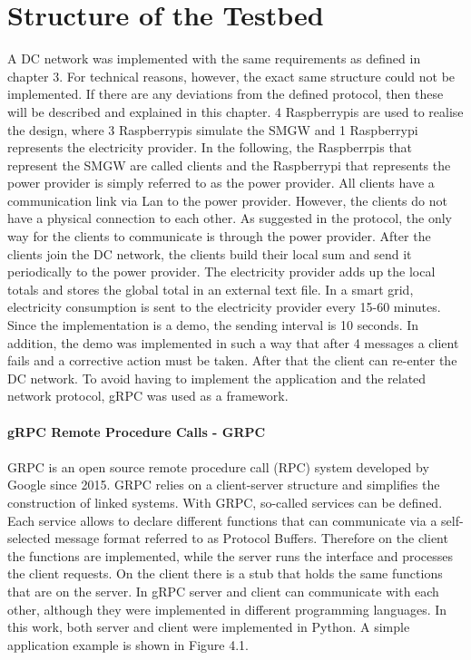 \section{Structure of the Testbed}
A DC network was implemented with the same requirements as defined in chapter 3. For technical reasons, however, the exact same structure could not be implemented. If there are any deviations from the defined protocol, then these will be described and explained in this chapter.
4 Raspberrypis are used to realise the design, where 3 Raspberrypis simulate the SMGW and 1 Raspberrypi represents the electricity provider.  In the following, the Raspberrpis that represent the SMGW are called clients and the Raspberrypi that represents the power provider is simply referred to as the power provider. All clients have a communication link via Lan to the power provider. However, the clients do not have a physical connection to each other. As suggested in the protocol, the only way for the clients to communicate is through the power provider. After the clients join the DC network, the clients build their local sum and send it periodically to the power provider. The electricity provider adds up the local totals and stores the global total in an external text file. In a smart grid, electricity consumption is sent to the electricity provider every 15-60 minutes. Since the implementation is a demo, the sending interval is 10 seconds. In addition, the demo was implemented in such a way that after 4 messages a client fails and a corrective action must be taken. After that the client can re-enter the DC network. To avoid having to implement the application and the related network protocol, gRPC was used as a framework.\\
\\
\textbf{gRPC Remote Procedure Calls - GRPC}
\\
\\
GRPC is an open source remote procedure call (RPC) system developed by Google since 2015. GRPC relies on a client-server structure and simplifies the construction of linked systems. With GRPC, so-called services can be defined. Each service allows to declare different functions that can communicate via a self-selected message format referred to as Protocol Buffers. Therefore on the client the functions are implemented, while the server runs the interface and processes the client requests. On the client there is a stub that holds the same functions that are on the server. In gRPC server and client can communicate with each other, although they were implemented in different programming languages. In this work, both server and client were implemented in Python. A simple application example is shown in Figure 4.1.
